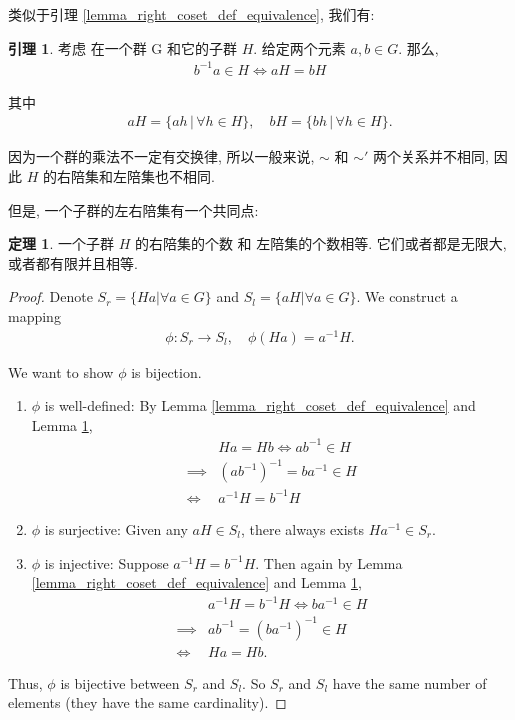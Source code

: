 \documentclass[utf8]{ctexbook}
\theoremstyle{definition}
\newtheorem{prototheorem}{定理}[section]
\newenvironment{theorem}
   {\colorlet{shadecolor}{pink!30}\begin{shaded}\begin{prototheorem}}
   {\end{prototheorem}\end{shaded}}
\newtheorem{lemma}{引理}[section]
\begin{document}
类似于引理 \ref{lemma_right_coset_def_equivalence}, 我们有:

\begin{lemma}\label{lemma_left_coset_def_equivalence}
考虑 在一个群 G 和它的子群 $H$. 给定两个元素 $a, b \in G$. 那么,
\begin{align*}
 b^{-1} a \in H \iff aH = bH 
\end{align*}

其中
\begin{align*}
aH = \{ ah \, | \, \forall h \in H \} , \quad bH = \{ bh \, | \, \forall h \in H \} .
\end{align*}

\end{lemma}

因为一个群的乘法不一定有交换律, 所以一般来说, $\sim$ 和 $\sim'$ 两个关系并不相同, 因此 $H$ 的右陪集和左陪集也不相同.

但是, 一个子群的左右陪集有一个共同点:
\begin{theorem}\label{thm_left_right_coset}
一个子群 $H$ 的右陪集的个数 和 左陪集的个数相等. 它们或者都是无限大, 或者都有限并且相等.
\end{theorem}

\begin{proof}
Denote $S_r =\{ Ha | \forall a \in G \}$ and $S_l = \{ a H | \forall a \in G \}$. We construct a mapping
\begin{align*}
\phi: S_r \longrightarrow S_l, \quad \phi( Ha ) =  a^{-1} H .
\end{align*}

We want to show $\phi$ is bijection.

\begin{enumerate}
\item{$\phi$ is well-defined: By Lemma \ref{lemma_right_coset_def_equivalence} and Lemma \ref{lemma_left_coset_def_equivalence}, 
\begin{align*}
& Ha = Hb \iff a b^{-1}  \in H \\
\implies & (a b^{-1})^{-1} = b a^{-1} \in H \\
\iff & a^{-1} H = b^{-1} H
\end{align*}
}
\item{$\phi$ is surjective: Given any $aH \in S_l$, there always exists $Ha^{-1} \in S_r$.}
\item{$\phi$ is injective: Suppose $a^{-1} H = b^{-1} H$. Then again by Lemma \ref{lemma_right_coset_def_equivalence} and Lemma \ref{lemma_left_coset_def_equivalence},
\begin{align*}
& a^{-1} H = b^{-1} H \iff b a^{-1} \in H \\
\implies & ab^{-1} = (b a^{-1} )^{-1} \in H \\
\iff & Ha = Hb .
\end{align*}
}
\end{enumerate}

Thus, $\phi$ is bijective between $S_r$ and $S_l$. So $S_r$ and $S_l$ have the same number of elements (they have the same cardinality).

\end{proof}
\end{document}
